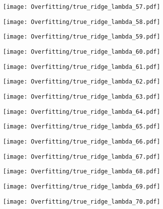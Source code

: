 \documentclass[xcolor=pdftex,dvipsnames,table]{beamer}
\begin{document}
\frame
{
	\begin{center}
		\texttt{[image: Overfitting/true\_ridge\_lambda\_57.pdf]}
	\end{center}
}
\frame
{
	\begin{center}
		\texttt{[image: Overfitting/true\_ridge\_lambda\_58.pdf]}
	\end{center}
}
\frame
{
	\begin{center}
		\texttt{[image: Overfitting/true\_ridge\_lambda\_59.pdf]}
	\end{center}
}
\frame
{
	\begin{center}
		\texttt{[image: Overfitting/true\_ridge\_lambda\_60.pdf]}
	\end{center}
}
\frame
{
	\begin{center}
		\texttt{[image: Overfitting/true\_ridge\_lambda\_61.pdf]}
	\end{center}
}
\frame
{
	\begin{center}
		\texttt{[image: Overfitting/true\_ridge\_lambda\_62.pdf]}
	\end{center}
}
\frame
{
	\begin{center}
		\texttt{[image: Overfitting/true\_ridge\_lambda\_63.pdf]}
	\end{center}
}
\frame
{
	\begin{center}
		\texttt{[image: Overfitting/true\_ridge\_lambda\_64.pdf]}
	\end{center}
}
\frame
{
	\begin{center}
		\texttt{[image: Overfitting/true\_ridge\_lambda\_65.pdf]}
	\end{center}
}
\frame
{
	\begin{center}
		\texttt{[image: Overfitting/true\_ridge\_lambda\_66.pdf]}
	\end{center}
}
\frame
{
	\begin{center}
		\texttt{[image: Overfitting/true\_ridge\_lambda\_67.pdf]}
	\end{center}
}
\frame
{
	\begin{center}
		\texttt{[image: Overfitting/true\_ridge\_lambda\_68.pdf]}
	\end{center}
}
\frame
{
	\begin{center}
		\texttt{[image: Overfitting/true\_ridge\_lambda\_69.pdf]}
	\end{center}
}
\frame
{
	\begin{center}
		\texttt{[image: Overfitting/true\_ridge\_lambda\_70.pdf]}
	\end{center}
}
\end{document}

